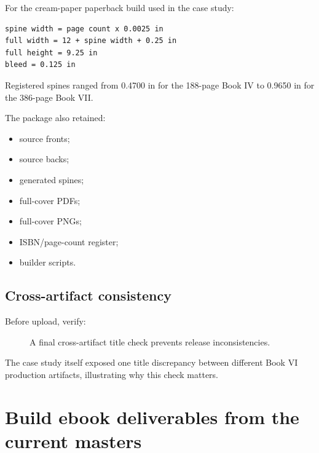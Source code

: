 \documentclass[11pt,oneside,openany]{book}
\providecommand{\tightlist}{%
  \setlength{\itemsep}{0pt}\setlength{\parskip}{0pt}}
\begin{document}
For the cream-paper paperback build used in the case study:

\begin{lstlisting}
spine width = page count x 0.0025 in
full width = 12 + spine width + 0.25 in
full height = 9.25 in
bleed = 0.125 in
\end{lstlisting}

Registered spines ranged from 0.4700 in for the 188-page Book IV to 0.9650 in for the 386-page Book VII.

The package also retained:

\begin{itemize}
\tightlist
\item
  source fronts;
\item
  source backs;
\item
  generated spines;
\item
  full-cover PDFs;
\item
  full-cover PNGs;
\item
  ISBN/page-count register;
\item
  builder scripts.
\end{itemize}

\section{Cross-artifact consistency}\label{cross-artifact-consistency}

Before upload, verify:

\begin{figure}[htbp]
\centering
{}
\caption{A final cross-artifact title check prevents release inconsistencies.}
\end{figure}

The case study itself exposed one title discrepancy between different Book VI production artifacts, illustrating why this check matters.

\chapter{Build ebook deliverables from the current masters}
\end{document}
